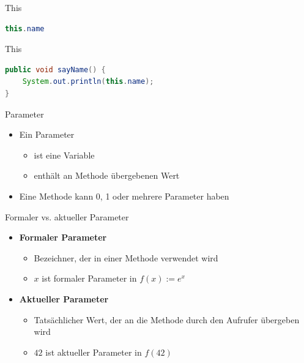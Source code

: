 \documentclass[18pt]{beamer}
\begin{document}
\begin{frame}[fragile]{This}
    \begin{exampleblock}{}
        \begin{lstlisting}[language=Java,basicstyle=\Huge]
this.name
        \end{lstlisting}
    \end{exampleblock}
\end{frame}


\begin{frame}[fragile]{This}
    \begin{exampleblock}{}
        \begin{lstlisting}[language=Java]
public void sayName() {
    System.out.println(this.name);
}
        \end{lstlisting}
    \end{exampleblock}
\end{frame}

\begin{frame}{Parameter}
    \begin{itemize}
        \item Ein Parameter
        \begin{itemize}
            \item ist eine Variable
            \item enthält an Methode übergebenen Wert
        \end{itemize}
        \item Eine Methode kann 0, 1 oder mehrere Parameter haben
    \end{itemize}
\end{frame}

\begin{frame}{Formaler vs. aktueller Parameter}
    \begin{itemize}
        \item \textbf{Formaler Parameter}
        \begin{itemize}
            \item Bezeichner, der in einer Methode verwendet wird
            \item $x$ ist formaler Parameter in $f(x) := e^x$
        \end{itemize}
        \vspace{.2in}
        \item \textbf{Aktueller Parameter}
        \begin{itemize}
            \item Tatsächlicher Wert, der an die Methode durch den Aufrufer übergeben wird
            \item $42$ ist aktueller Parameter in $f(42)$
        \end{itemize}
    \end{itemize}
\end{frame}
\end{document}
